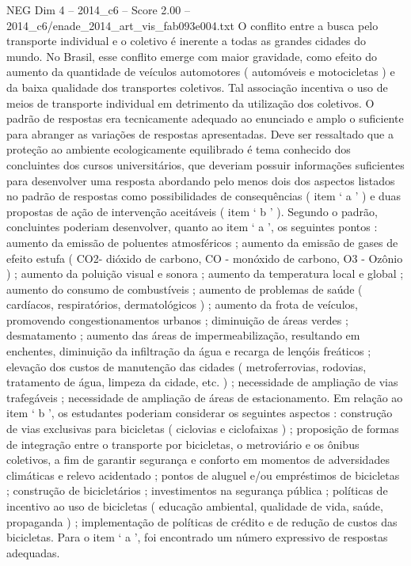 \begin{textsample}{NEG Dim 4 – 2014\_c6 – Score 2.00 – 2014\_c6/enade\_2014\_art\_vis\_fab093e004.txt}
O conflito entre a busca pelo transporte individual e o coletivo é inerente a todas as grandes cidades do mundo.
No Brasil, esse conflito emerge com maior gravidade, como efeito do aumento da quantidade de veículos automotores ( automóveis e motocicletas ) e da baixa qualidade dos transportes coletivos.
Tal associação incentiva o uso de meios de transporte individual em detrimento da utilização dos coletivos.
O padrão de respostas era tecnicamente adequado ao enunciado e amplo o suficiente para abranger as variações de respostas apresentadas.
Deve ser ressaltado que a proteção ao ambiente ecologicamente equilibrado é tema conhecido dos concluintes dos cursos universitários, que deveriam possuir informações suficientes para desenvolver uma resposta abordando pelo menos dois dos aspectos listados no padrão de respostas como possibilidades de consequências ( item ‘ a ’ ) e duas propostas de ação de intervenção aceitáveis ( item ‘ b ’ ).
Segundo o padrão, concluintes poderiam desenvolver, quanto ao item ‘ a ’, os seguintes pontos : aumento da emissão de poluentes atmosféricos ; aumento da emissão de gases de efeito estufa ( CO2- dióxido de carbono, CO - monóxido de carbono, O3 - Ozônio ) ; aumento da poluição visual e sonora ; aumento da temperatura local e global ; aumento do consumo de combustíveis ; aumento de problemas de saúde ( cardíacos, respiratórios, dermatológicos ) ; aumento da frota de veículos, promovendo congestionamentos urbanos ; diminuição de áreas verdes ; desmatamento ; aumento das áreas de impermeabilização, resultando em enchentes, diminuição da infiltração da água e recarga de lençóis freáticos ; elevação dos custos de manutenção das cidades ( metroferrovias, rodovias, tratamento de água, limpeza da cidade, etc. ) ; necessidade de ampliação de vias trafegáveis ; necessidade de ampliação de áreas de estacionamento.
Em relação ao item ‘ b ’, os estudantes poderiam considerar os seguintes aspectos : construção de vias exclusivas para bicicletas ( ciclovias e ciclofaixas ) ; proposição de formas de integração entre o transporte por bicicletas, o metroviário e os ônibus coletivos, a fim de garantir segurança e conforto em momentos de adversidades climáticas e relevo acidentado ; pontos de aluguel e/ou empréstimos de bicicletas ; construção de bicicletários ; investimentos na segurança pública ; políticas de incentivo ao uso de bicicletas ( educação ambiental, qualidade de vida, saúde, propaganda ) ; implementação de políticas de crédito e de redução de custos das bicicletas.
Para o item ‘ a ’, foi encontrado um número expressivo de respostas adequadas.

\end{textsample}
